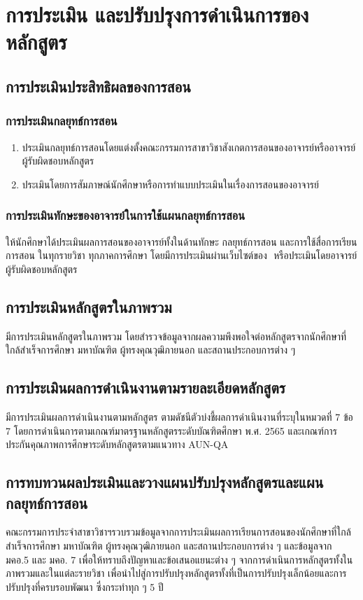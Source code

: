 \chapter{การประเมิน และปรับปรุงการดำเนินการของหลักสูตร}

\section{การประเมินประสิทธิผลของการสอน}

\subsection{การประเมินกลยุทธ์การสอน}
\begin{enumerate}
   	\item ประเมินกลยุทธ์การสอนโดยแต่งตั้งคณะกรรมการสาขาวิชาสังเกตการสอนของอาจารย์หรืออาจารย์ผู้รับผิดชอบหลักสูตร  
   	\item ประเมินโดยการสัมภาษณ์นักศึกษาหรือการทำแบบประเมินในเรื่องการสอนของอาจารย์   
   	 \end{enumerate}  
\subsection{การประเมินทักษะของอาจารย์ในการใช้แผนกลยุทธ์การสอน}
\university ให้นักศึกษาได้ประเมินผลการสอนของอาจารย์ทั้งในด้านทักษะ กลยุทธ์การสอน และการใช้สื่อการเรียนการสอน ในทุกรายวิชา ทุกภาคการศึกษา โดยมีการประเมินผ่านเว็บไซต์ของ\university \,\, หรือประเมินโดยอาจารย์ผู้รับผิดชอบหลักสูตร

\section{การประเมินหลักสูตรในภาพรวม}
มีการประเมินหลักสูตรในภาพรวม โดยสำรวจข้อมูลจากผลความพึงพอใจต่อหลักสูตรจากนักศึกษาที่ใกล้สำเร็จการศึกษา มหาบัณฑิต ผู้ทรงคุณวุฒิภายนอก และสถานประกอบการต่าง ๆ
\section{การประเมินผลการดำเนินงานตามรายละเอียดหลักสูตร}
มีการประเมินผลการดำเนินงานตามหลักสูตร ตามดัชนีตัวบ่งชี้ผลการดำเนินงานที่ระบุในหมวดที่ 7 ข้อ 7 โดยการดำเนินการตามเกณฑ์มาตรฐานหลักสูตรระดับบัณฑิตศึกษา พ.ศ. 2565 และเกณฑ์การประกันคุณภาพการศึกษาระดับหลักสูตรตามแนวทาง AUN-QA

\section{การทบทวนผลประเมินและวางแผนปรับปรุงหลักสูตรและแผนกลยุทธ์การสอน}
คณะกรรมการประจำสาขาวิชาฯรวบรวมข้อมูลจากการประเมินผลการเรียนการสอนของนักศึกษาที่ใกล้สำเร็จการศึกษา มหาบัณฑิต ผู้ทรงคุณวุฒิภายนอก และสถานประกอบการต่าง ๆ และข้อมูลจาก มคอ.5 และ มคอ. 7 เพื่อให้ทราบถึงปัญหาและข้อเสนอแยนะต่าง ๆ จากการดำเนินการหลักสูตรทั้งในภาพรวมและในแต่ละรายวิชา เพื่อนำไปสู่การปรับปรุงหลักสูตรทั้งที่เป็นการปรับปรุงเล็กน้อยและการปรับปรุงที่ครบรอบพัฒนา ซึ่งกระทำทุก ๆ 5 ปี










